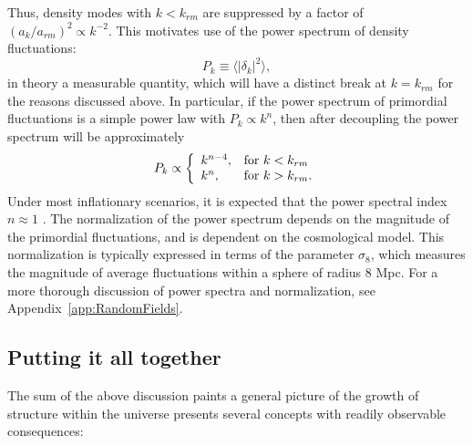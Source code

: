 Thus, density modes with $k < k_{rm}$ are suppressed by a factor of
$(a_k / a_{rm})^2 \propto k^{-2}$.  This motivates use of the power
spectrum of density fluctuations:
\begin{equation}
  \label{eq:power_spectrum}
  P_k \equiv \langle|\delta_k|^2\rangle,
\end{equation}
in theory a measurable quantity, which will have a distinct break at
$k = k_{rm}$ for the reasons discussed above.
In particular, if the power spectrum of primordial fluctuations
is a simple power law with $P_k \propto k^n$,
then after decoupling the power spectrum will be approximately
\begin{equation}
  P_k \propto \left\{
  \begin{array}{ll}
    k^{n-4}, & {\rm for\ } k < k_{rm} \\
    k^n, & {\rm for\ } k > k_{rm}.
  \end{array}
  \right.
\end{equation}
Under most inflationary scenarios, it is expected that the power spectral
index $n \approx 1$ \citep{peacock1999cosmological}.
The normalization of the power spectrum depends on the magnitude of the
primordial fluctuations, and is dependent on the cosmological model.
This normalization is typically expressed in terms of the parameter
$\sigma_8$, which measures the magnitude of average fluctuations within
a sphere of radius 8 Mpc.  For a more thorough discussion of power spectra
and normalization, see Appendix~\ref{app:RandomFields}.

\subsection{Putting it all together}
The sum of the above discussion paints a general picture of the growth of
structure within the universe presents several concepts with readily
observable consequences:

